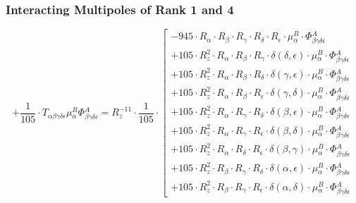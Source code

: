 \documentclass{article}
\begin{document}
\subsubsection{Interacting Multipoles of Rank 1 and 4}
\begin{equation}
+ \frac{1}{105} \cdot T_{\alpha{}\beta{}\gamma{}\delta{}\epsilon{}} \mu{}^{B}_{\alpha{}} \Phi{}^{A}_{\beta{}\gamma{}\delta{}\epsilon{}} = R_{z}^{-11} \cdot \frac{1}{105} \cdot  \left[ \begin{array}{c} 
 		- 945 \cdot R_{\alpha{}} \cdot R_{\beta{}} \cdot R_{\gamma{}} \cdot R_{\delta{}} \cdot R_{\epsilon{}} \cdot \mu{}^{B}_{\alpha{}} \cdot \Phi{}^{A}_{\beta{}\gamma{}\delta{}\epsilon{}} 
 \\[0.2em] 		 + 105 \cdot R_{z}^{2} \cdot R_{\alpha{}} \cdot R_{\beta{}} \cdot R_{\gamma{}} \cdot \delta{}\left(\delta{}, \epsilon{}\right) \cdot \mu{}^{B}_{\alpha{}} \cdot \Phi{}^{A}_{\beta{}\gamma{}\delta{}\epsilon{}} 
 \\[0.2em] 		 + 105 \cdot R_{z}^{2} \cdot R_{\alpha{}} \cdot R_{\beta{}} \cdot R_{\delta{}} \cdot \delta{}\left(\gamma{}, \epsilon{}\right) \cdot \mu{}^{B}_{\alpha{}} \cdot \Phi{}^{A}_{\beta{}\gamma{}\delta{}\epsilon{}} 
 \\[0.2em] 		 + 105 \cdot R_{z}^{2} \cdot R_{\alpha{}} \cdot R_{\beta{}} \cdot R_{\epsilon{}} \cdot \delta{}\left(\gamma{}, \delta{}\right) \cdot \mu{}^{B}_{\alpha{}} \cdot \Phi{}^{A}_{\beta{}\gamma{}\delta{}\epsilon{}} 
 \\[0.2em] 		 + 105 \cdot R_{z}^{2} \cdot R_{\alpha{}} \cdot R_{\gamma{}} \cdot R_{\delta{}} \cdot \delta{}\left(\beta{}, \epsilon{}\right) \cdot \mu{}^{B}_{\alpha{}} \cdot \Phi{}^{A}_{\beta{}\gamma{}\delta{}\epsilon{}} 
 \\[0.2em] 		 + 105 \cdot R_{z}^{2} \cdot R_{\alpha{}} \cdot R_{\gamma{}} \cdot R_{\epsilon{}} \cdot \delta{}\left(\beta{}, \delta{}\right) \cdot \mu{}^{B}_{\alpha{}} \cdot \Phi{}^{A}_{\beta{}\gamma{}\delta{}\epsilon{}} 
 \\[0.2em] 		 + 105 \cdot R_{z}^{2} \cdot R_{\alpha{}} \cdot R_{\delta{}} \cdot R_{\epsilon{}} \cdot \delta{}\left(\beta{}, \gamma{}\right) \cdot \mu{}^{B}_{\alpha{}} \cdot \Phi{}^{A}_{\beta{}\gamma{}\delta{}\epsilon{}} 
 \\[0.2em] 		 + 105 \cdot R_{z}^{2} \cdot R_{\beta{}} \cdot R_{\gamma{}} \cdot R_{\delta{}} \cdot \delta{}\left(\alpha{}, \epsilon{}\right) \cdot \mu{}^{B}_{\alpha{}} \cdot \Phi{}^{A}_{\beta{}\gamma{}\delta{}\epsilon{}} 
 \\[0.2em] 		 + 105 \cdot R_{z}^{2} \cdot R_{\beta{}} \cdot R_{\gamma{}} \cdot R_{\epsilon{}} \cdot \delta{}\left(\alpha{}, \delta{}\right) \cdot \mu{}^{B}_{\alpha{}} \cdot \Phi{}^{A}_{\beta{}\gamma{}\delta{}\epsilon{}} 

\end{array}
\end{equation}
\end{document}
